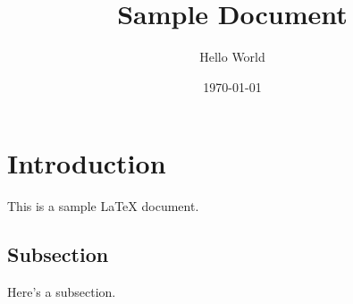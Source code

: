 \documentclass{article} %
\title{Sample Document} %
\author{Hello World} %
\date{\today} %
\begin{document}
\maketitle %

\section{Introduction} %
This is a sample LaTeX document.

\subsection{Subsection}
Here's a subsection.
\end{document}
